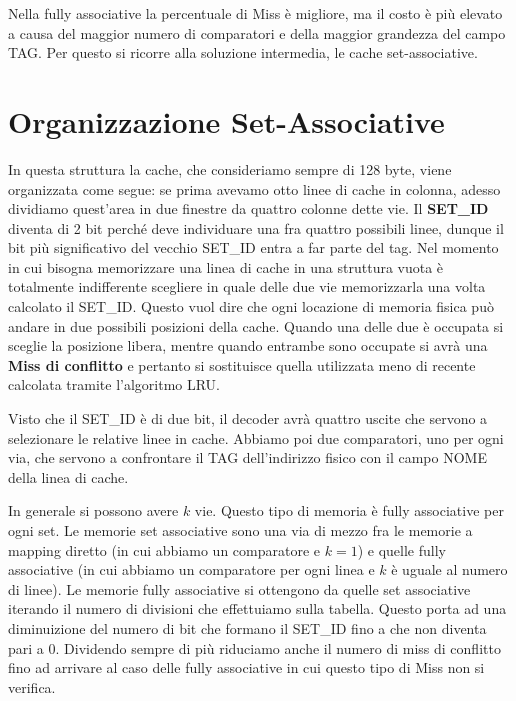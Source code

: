 \documentclass[11pt]{book}
\begin{document}
Nella fully associative la percentuale di Miss \`e migliore, ma il
costo \`e pi\`u elevato a causa del maggior numero di comparatori e
della maggior grandezza del campo TAG. Per questo si ricorre alla
soluzione intermedia, le cache set-associative.

\section{Organizzazione Set-Associative}

In questa struttura la cache, che consideriamo sempre di 128 byte,
viene organizzata come segue: se prima avevamo otto linee di cache in
colonna, adesso dividiamo quest'area in due finestre da quattro
colonne dette vie. Il {\bf SET\_ID} diventa di 2 bit perch\'e deve
individuare una fra quattro possibili linee, dunque il bit pi\`u
significativo del vecchio SET\_ID entra a far parte del tag. Nel
momento in cui bisogna memorizzare una linea di cache in una struttura
vuota \`e totalmente indifferente scegliere in quale delle due vie
memorizzarla una volta calcolato il SET\_ID. Questo vuol dire che ogni
locazione di memoria fisica pu\`o andare in due possibili posizioni
della cache. Quando una delle due \`e occupata si sceglie la posizione
libera, mentre quando entrambe sono occupate si avr\`a una {\bf Miss
  di conflitto} e pertanto si sostituisce quella utilizzata meno di
recente calcolata tramite l'algoritmo LRU.

\par\bigskip

Visto che il SET\_ID \`e di due bit, il decoder avr\`a quattro uscite
che servono a selezionare le relative linee in cache. Abbiamo poi due
comparatori, uno per ogni via, che servono a confrontare il TAG
dell'indirizzo fisico con il campo NOME della linea di cache.

\par\bigskip

In generale si possono avere $k$ vie. Questo tipo di memoria \`e fully
associative per ogni set. Le memorie set associative sono una via di
mezzo fra le memorie a mapping diretto (in cui abbiamo un comparatore
e $k=1$) e quelle fully associative (in cui abbiamo un comparatore per
ogni linea e $k$ \`e uguale al numero di linee). Le memorie fully
associative si ottengono da quelle set associative iterando il numero
di divisioni che effettuiamo sulla tabella. Questo porta ad una
diminuizione del numero di bit che formano il SET\_ID fino a che non
diventa pari a 0. Dividendo sempre di pi\`u riduciamo anche il numero
di miss di conflitto fino ad arrivare al caso delle fully associative
in cui questo tipo di Miss non si verifica.
\end{document}
